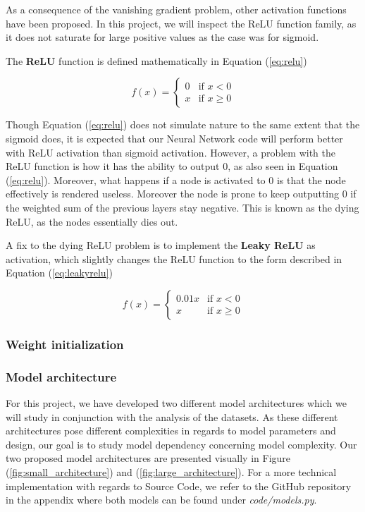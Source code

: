 \documentclass
[twocolumn,
secnumarabic,
nobibnotes,
aps,
prl,
reprint,
groupedaddress,
amsmath,
amssymb
]{revtex4-2}
\begin{document}
As a consequence of the vanishing gradient problem, other activation functions have been proposed. In this project, we will inspect the ReLU function family, as it does not saturate for large positive values as the case was for sigmoid.

The \textbf{ReLU} function is defined mathematically in Equation (\ref{eq:relu})

\begin{equation}
  \label{eq:relu}
  f(x) =
  \left\{
  \begin{array}{ll}
    0 & \mbox{if } x < 0    \\
    x & \mbox{if } x \geq 0
  \end{array}
  \right.
\end{equation}

Though Equation (\ref{eq:relu}) does not simulate nature to the same extent that the sigmoid does, it is expected that our Neural Network code will perform better with ReLU activation than sigmoid activation. However, a problem with the ReLU function is how it has the ability to output 0, as also seen in Equation (\ref{eq:relu}). Moreover, what happens if a node is activated to 0 is that the node effectively is rendered useless. Moreover the node is prone to keep outputting 0 if the weighted sum of the previous layers stay negative. This is known as the dying ReLU, as the nodes essentially dies out.

A fix to the dying ReLU problem is to implement the \textbf{Leaky ReLU} as activation, which slightly changes the ReLU function to the form described in Equation (\ref{eq:leakyrelu})

\begin{equation}
  \label{eq:leakyrelu}
  f(x) =
  \left\{
  \begin{array}{ll}
    0.01x & \mbox{if } x < 0    \\
    x     & \mbox{if } x \geq 0
  \end{array}
  \right.
\end{equation}

\subsubsection{Weight initialization}

\subsubsection{Model architecture}
For this project, we have developed two different model architectures which we will study in conjunction with the analysis of the datasets. As these different architectures pose different complexities in regards to model parameters and design, our goal is to study model dependency concerning model complexity. Our two proposed model architectures are presented visually in Figure (\ref{fig:small_architecture}) and (\ref{fig:large_architecture}). For a more technical implementation with regards to Source Code, we refer to the GitHub repository in the appendix where both models can be found under \textit{code/models.py}.
\end{document}

